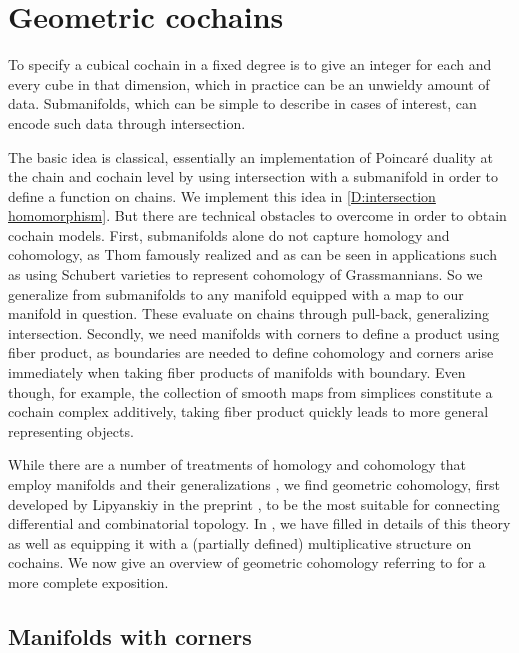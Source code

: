 
\section{Geometric cochains}\label{S:geometric cochains}

To specify a cubical cochain in a fixed degree is to give an integer for each and every cube in that dimension, which in practice can be an unwieldy amount of data.
Submanifolds, which can be simple to describe in cases of interest, can encode such data through intersection.

The basic idea is classical, essentially an implementation of Poincar\'e duality at the chain and cochain level by using intersection with a submanifold in order to define a function on chains.
We implement this idea in \cref{D:intersection homomorphism}.
But there are technical obstacles to overcome in order to obtain cochain models.
First, submanifolds alone do not capture homology and cohomology, as Thom famously realized and as can be seen in applications such as using Schubert varieties to represent cohomology of Grassmannians.
So we generalize from submanifolds to any manifold equipped with a map to our manifold in question.
These evaluate on chains through pull-back, generalizing intersection.
Secondly, we need manifolds with corners to define a product using fiber product, as boundaries are needed to define cohomology and corners arise immediately when taking fiber products of manifolds with boundary. Even though, for example, the collection of smooth maps from simplices constitute a cochain complex additively, taking fiber product quickly leads to more general representing objects.

While there are a number of treatments of homology and cohomology that employ manifolds and their generalizations \cite{Whit47, BRS76, FeSj83, Krec10, Kahn01, Zing08, Joyc15}, we find {geometric cohomology}, first developed by Lipyanskiy in the preprint \cite{Lipy14}, to be the most suitable for connecting differential and combinatorial topology.
In \cite{medina2022foundations}, we have filled in details of this theory as well as equipping it with a (partially defined) multiplicative structure on cochains.
We now give an overview of geometric cohomology referring to \cite{medina2022foundations} for a more complete exposition.

\subsection{Manifolds with corners}


